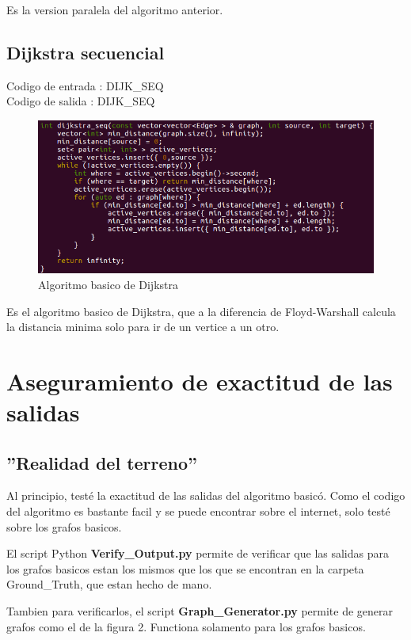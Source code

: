 \documentclass[a4paper,11pt]{article}
\begin{document}
Es la version paralela del algoritmo anterior.

\subsection{Dijkstra secuencial}

\noindent Codigo de entrada : DIJK\_SEQ \\
Codigo de salida : DIJK\_SEQ

\begin{figure}[H]
\begin{center}
  \includegraphics[scale=0.6]{DIJK.png}
  \caption{Algoritmo basico de Dijkstra}
\end{center}
\end{figure}

Es el algoritmo basico de Dijkstra, que a la diferencia de Floyd-Warshall calcula la distancia minima solo para ir de un vertice a un otro.

\section{Aseguramiento de exactitud de las salidas}
\subsection{''Realidad del terreno''}

Al principio, testé la exactitud de las salidas del algoritmo basicó. Como el codigo del algoritmo es bastante facil y se puede encontrar sobre el internet, solo testé sobre los grafos basicos.

El script Python \textbf{Verify\_Output.py} permite de verificar que las salidas para los grafos basicos estan los mismos que los que se encontran en la carpeta Ground\_Truth, que estan hecho de mano.

Tambien para verificarlos, el script \textbf{Graph\_Generator.py} permite de generar grafos como el de la figura 2. Functiona solamento para los grafos basicos.
\end{document}
